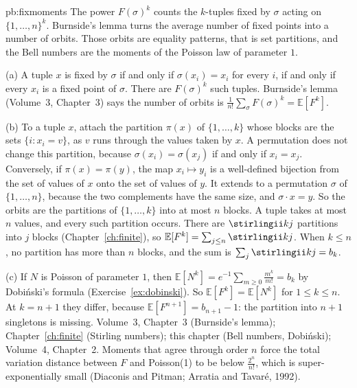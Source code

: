 \begin{solution}{pb:fixmoments}
\idea The power $F(\sigma)^k$ counts the $k$-tuples fixed by $\sigma$ acting on $\{1,\dots,n\}^k$. Burnside's lemma turns the average number of fixed points into a number of orbits. Those orbits are equality patterns, that is set partitions, and the Bell numbers are the moments of the Poisson law of parameter $1$.

\writeup (a) A tuple $x$ is fixed by $\sigma$ if and only if $\sigma(x_i)=x_i$ for every $i$, if and only if every $x_i$ is a fixed point of
$\sigma$. There are $F(\sigma)^k$ such tuples. Burnside's lemma (Volume~3, Chapter~3) says the number of orbits is
$\frac1{n!}\sum_\sigma F(\sigma)^k=\mathbb E[F^k]$.

(b) To a tuple $x$, attach the partition $\pi(x)$ of $\{1,\dots,k\}$ whose blocks are the sets $\{i:x_i=v\}$, as $v$ runs through the values taken
by $x$. A permutation does not change this partition, because $\sigma(x_i)=\sigma(x_j)$ if and only if $x_i=x_j$. Conversely, if $\pi(x)=\pi(y)$, the map
$x_i\mapsto y_i$ is a well-defined bijection from the set of values of $x$ onto the set of values of $y$. It extends to a permutation
$\sigma$ of $\{1,\dots,n\}$, because the two complements have the same size, and $\sigma\cdot x=y$. So the orbits are the
partitions of $\{1,\dots,k\}$ into at most $n$ blocks. A tuple takes at most $n$ values, and every such partition occurs.
There are $\stirlingii kj$ partitions into $j$ blocks (Chapter~\ref{ch:finite}), so $\mathbb E[F^k]=\sum_{j\le n}\stirlingii kj$.
When $k\le n$, no partition has more than $n$ blocks, and the sum is $\sum_j\stirlingii kj=b_k$.

(c) If $N$ is Poisson of parameter $1$, then $\mathbb E[N^k]=e^{-1}\sum_{m\ge0}\frac{m^k}{m!}=b_k$ by Dobiński's formula (Exercise~\ref{ex:dobinski}). So $\mathbb E[F^k]=\mathbb E[N^k]$ for $1\le k\le n$. At $k=n+1$ they differ, because $\mathbb E[F^{n+1}]=b_{n+1}-1$:
the partition into $n+1$ singletons is missing.
\tools Volume~3, Chapter~3 (Burnside's lemma); Chapter~\ref{ch:finite} (Stirling numbers); this chapter (Bell numbers, Dobiński); Volume~4, Chapter~2.
\leads Moments that agree through order $n$ force the total variation distance between $F$ and Poisson(1) to be below
$\frac{2^n}{n!}$, which is super-exponentially small (Diaconis and Pitman; Arratia and Tavaré, 1992).
\end{solution}

